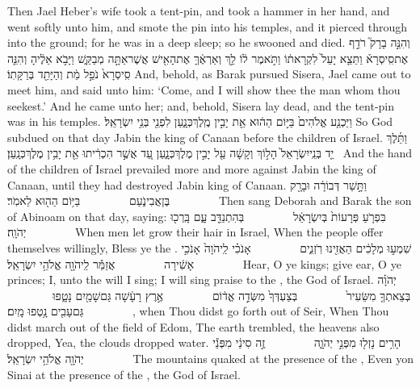 {Then Jael Heber’s wife took a tent-pin, and took a hammer in her hand, and went softly unto him, and smote the pin into his temples, and it pierced through into the ground; for he was in a deep sleep; so he swooned and died.}
{וְהִנֵּ֣ה בָרָק֮ רֹדֵ֣ף אֶת\maqqaf סִֽיסְרָא֒ וַתֵּצֵ֤א יָעֵל֙ לִקְרָאת֔וֹ וַתֹּ֣אמֶר ל֔וֹ לֵ֣ךְ וְאַרְאֶ֔ךָּ אֶת\maqqaf הָאִ֖ישׁ אֲשֶׁר\maqqaf אַתָּ֣ה מְבַקֵּ֑שׁ וַיָּבֹ֣א אֵלֶ֔יהָ וְהִנֵּ֤ה סִֽיסְרָא֙ נֹפֵ֣ל מֵ֔ת וְהַיָּתֵ֖ד בְּרַקָּתֽוֹ׃}
{And, behold, as Barak pursued Sisera, Jael came out to meet him, and said unto him: ‘Come, and I will show thee the man whom thou seekest.’ And he came unto her; and, behold, Sisera lay dead, and the tent-pin was in his temples.}
{וַיַּכְנַ֤ע אֱלֹהִים֙ בַּיּ֣וֹם הַה֔וּא אֵ֖ת יָבִ֣ין מֶֽלֶךְ\maqqaf כְּנָ֑עַן לִפְנֵ֖י בְּנֵ֥י יִשְׂרָאֵֽל׃}
{So God subdued on that day Jabin the king of Canaan before the children of Israel.}
{וַתֵּ֜לֶךְ יַ֤ד בְּנֵֽי\maqqaf יִשְׂרָאֵל֙ הָל֣וֹךְ וְקָשָׁ֔ה עַ֖ל יָבִ֣ין מֶלֶךְ\maqqaf כְּנָ֑עַן עַ֚ד אֲשֶׁ֣ר הִכְרִ֔יתוּ אֵ֖ת יָבִ֥ין מֶלֶךְ\maqqaf כְּנָֽעַן׃ \petucha }
{And the hand of the children of Israel prevailed more and more against Jabin the king of Canaan, until they had destroyed Jabin king of Canaan.}
\newperek
{}
{וַתָּ֣שַׁר דְּבוֹרָ֔ה וּבָרָ֖ק בֶּן\maqqaf אֲבִינֹ֑עַם         בַּיּ֥וֹם הַה֖וּא לֵאמֹֽר׃        }
{Then sang Deborah and Barak the son of Abinoam on that day, saying:}
{בִּפְרֹ֤עַ פְּרָעוֹת֙ בְּיִשְׂרָאֵ֔ל         בְּהִתְנַדֵּ֖ב עָ֑ם בָּֽרְכ֖וּ יְהֹוָֽה׃        }
{When men let grow their hair in Israel, When the people offer themselves willingly, Bless ye the \lord.}
{שִׁמְע֣וּ מְלָכִ֔ים הַאֲזִ֖ינוּ רֹֽזְנִ֑ים         אָנֹכִ֗י לַֽיהֹוָה֙ אָנֹכִ֣י אָשִׁ֔ירָה         אֲזַמֵּ֕ר לַֽיהֹוָ֖ה אֱלֹהֵ֥י יִשְׂרָאֵֽל׃        }
{Hear, O ye kings; give ear, O ye princes; I, unto the \lord\space will I sing; I will sing praise to the \lord, the God of Israel.}
{יְהֹוָ֗ה בְּצֵאתְךָ֤ מִשֵּׂעִיר֙         בְּצַעְדְּךָ֙ מִשְּׂדֵ֣ה אֱד֔וֹם         אֶ֣רֶץ רָעָ֔שָׁה גַּם\maqqaf שָׁמַ֖יִם נָטָ֑פוּ         גַּם\maqqaf עָבִ֖ים נָ֥טְפוּ מָֽיִם׃        }
{\lord, when Thou didst go forth out of Seir, When Thou didst march out of the field of Edom, The earth trembled, the heavens also dropped, Yea, the clouds dropped water.}
{הָרִ֥ים נָזְל֖וּ מִפְּנֵ֣י יְהֹוָ֑ה         זֶ֣ה סִינַ֔י מִפְּנֵ֕י יְהֹוָ֖ה אֱלֹהֵ֥י יִשְׂרָאֵֽל׃        }
{The mountains quaked at the presence of the \lord, Even yon Sinai at the presence of the \lord, the God of Israel.}
